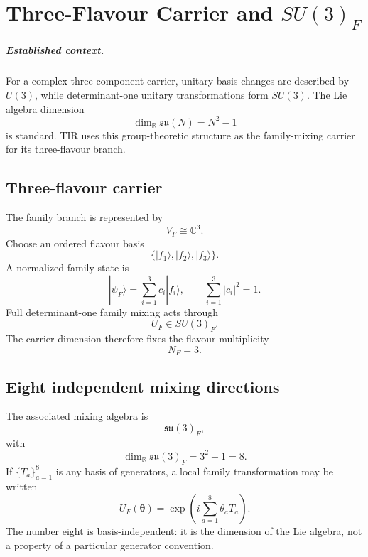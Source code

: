 \chapter[Three-Flavour Carrier]{Three-Flavour Carrier and $SU(3)_F$}
\label{ch:v12_three_flavour_su3}

\paragraph{Established context.}
For a complex three-component carrier, unitary basis changes are described by
$U(3)$, while determinant-one unitary transformations form $SU(3)$.  The Lie
algebra dimension
\[
\dim_{\mathbb R}\mathfrak{su}(N)=N^2-1
\]
is standard.  TIR uses this group-theoretic structure as the family-mixing
carrier for its three-flavour branch.


\section{Three-flavour carrier}
The family branch is represented by
\begin{equation}
\boxed{V_F\cong\mathbb C^3.}
\label{eq:v12-flavour-carrier}
\end{equation}
Choose an ordered flavour basis
\[
\{|f_1\rangle,|f_2\rangle,|f_3\rangle\}.
\]
A normalized family state is
\[
|\psi_F\rangle
=\sum_{i=1}^{3}c_i|f_i\rangle,
\qquad
\sum_{i=1}^{3}|c_i|^2=1.
\]
Full determinant-one family mixing acts through
\begin{equation}
\boxed{U_F\in SU(3)_F.}
\label{eq:v12-su3f-carrier}
\end{equation}
The carrier dimension therefore fixes the flavour multiplicity
\begin{equation}
\boxed{N_F=3.}
\label{eq:v12-flavour-multiplicity}
\end{equation}

\section{Eight independent mixing directions}
The associated mixing algebra is
\[
\mathfrak{su}(3)_F,
\]
with
\begin{equation}
\boxed{
\dim_{\mathbb R}\mathfrak{su}(3)_F
=3^2-1
=8.
}
\label{eq:v12-su3f-dimension}
\end{equation}
If $\{T_a\}_{a=1}^{8}$ is any basis of generators, a local family
transformation may be written
\[
U_F(\boldsymbol\theta)
=\exp\!\left(i\sum_{a=1}^{8}\theta_aT_a\right).
\]
The number eight is basis-independent: it is the dimension of the Lie algebra,
not a property of a particular generator convention.

